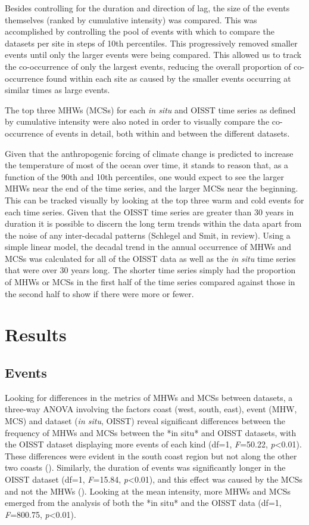 \documentclass[a4paper,10pt,review]{elsarticle}
\begin{document}
Besides controlling for the duration and direction of lag, the size of the events themselves (ranked by cumulative intensity) was compared. This was accomplished by controlling the pool of events with which to compare the datasets per site in steps of 10th percentiles. This progressively removed smaller events until only the larger events were being compared. This allowed us to track the co-occurrence of only the largest events, reducing the overall proportion of co-occurrence found within each site as caused by the smaller events occurring at similar times as large events.

The top three MHWs (MCSs) for each \emph{in situ} and OISST time series as defined by cumulative intensity were also noted in order to visually compare the co-occurrence of events in detail, both within and between the different datasets.

Given that the anthropogenic forcing of climate change is predicted to increase the temperature of most of the ocean over time, it stands to reason that, as a function of the 90th and 10th percentiles, one would expect to see the larger MHWs near the end of the time series, and the larger MCSs near the beginning. This can be tracked visually by looking at the top three warm and cold events for each time series. Given that the OISST time series are greater than 30 years in duration it is possible to discern the long term trends within the data apart from the noise of any inter-decadal patterns (Schlegel and Smit, in review). Using a simple linear model, the decadal trend in the annual occurrence of MHWs and MCSs was calculated for all of the OISST data as well as the \emph{in situ} time series that were over 30 years long. The shorter time series simply had the proportion of MHWs or MCSs in the first half of the time series compared against those in the second half to show if there were more or fewer.

\section{Results}

\subsection{Events}
Looking for differences in the metrics of MHWs and MCSs between datasets, a three-way ANOVA involving the factors coast (west, south, east), event (MHW, MCS) and dataset (\emph{in situ}, OISST) reveal significant differences between the frequency of MHWs and MCSs between the *in situ* and OISST datasets, with the OISST dataset displaying more events of each kind (df=1, \emph{F}=50.22, \emph{p}<0.01). These differences were evident in the south coast region but not along the other two coasts (). Similarly, the duration of events was significantly longer in the OISST dataset (df=1, \emph{F}=15.84, \emph{p}<0.01), and this effect was caused by the MCSs and not the MHWs (). Looking at the mean intensity, more MHWs and MCSs emerged from the analysis of both the *in situ* and the OISST data (df=1, \emph{F}=800.75, \emph{p}<0.01).
\end{document}

